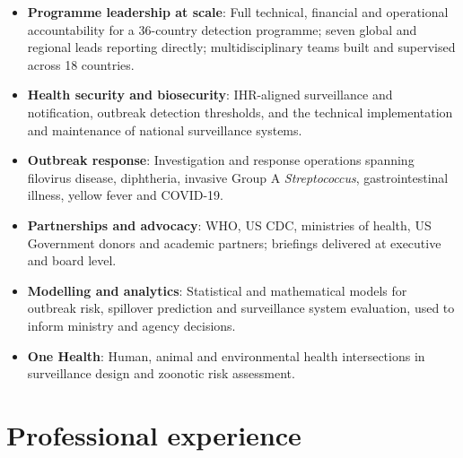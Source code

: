 \documentclass[11pt,a4paper,]{awesome-cv}
\providecommand{\tightlist}{%
	\setlength{\itemsep}{0pt}\setlength{\parskip}{0pt}}
\begin{document}
\begin{itemize}
\tightlist
\item
  \textbf{Programme leadership at scale}: Full technical, financial and
  operational accountability for a 36-country detection programme; seven
  global and regional leads reporting directly; multidisciplinary teams
  built and supervised across 18 countries.
\item
  \textbf{Health security and biosecurity}: IHR-aligned surveillance and
  notification, outbreak detection thresholds, and the technical
  implementation and maintenance of national surveillance systems.
\item
  \textbf{Outbreak response}: Investigation and response operations
  spanning filovirus disease, diphtheria, invasive Group A
  \emph{Streptococcus}, gastrointestinal illness, yellow fever and
  COVID-19.
\item
  \textbf{Partnerships and advocacy}: WHO, US CDC, ministries of health,
  US Government donors and academic partners; briefings delivered at
  executive and board level.
\item
  \textbf{Modelling and analytics}: Statistical and mathematical models
  for outbreak risk, spillover prediction and surveillance system
  evaluation, used to inform ministry and agency decisions.
\item
  \textbf{One Health}: Human, animal and environmental health
  intersections in surveillance design and zoonotic risk assessment.
\end{itemize}

\section{Professional experience}\label{professional-experience}
\end{document}
